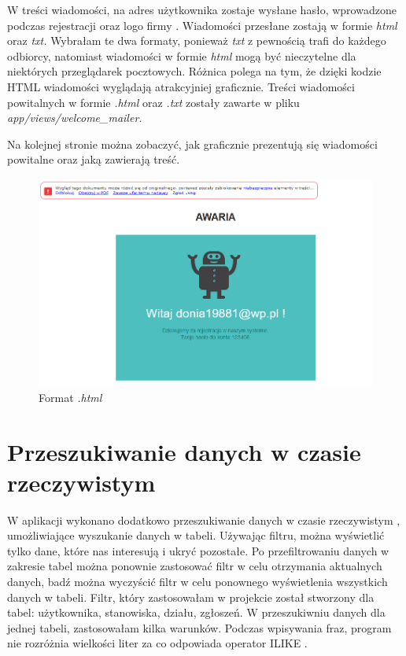 \documentclass[openright]{xmgr}
\begin{document}
	W treści wiadomości, na adres użytkownika zostaje wysłane hasło, wprowadzone podczas rejestracji oraz logo firmy \cite{api}. Wiadomości przesłane zostają w formie \textit{html} oraz \textit{txt.} Wybrałam te dwa formaty, ponieważ \textit{txt} z pewnością trafi do każdego odbiorcy, natomiast wiadomości w formie \textit{html} mogą być nieczytelne dla niektórych przeglądarek pocztowych. Różnica polega na tym, że dzięki kodzie HTML wiadomości wyglądają atrakcyjniej graficznie.
	Treści wiadomości powitalnych w formie \textit{.html} oraz \textit{.txt} zostały zawarte w pliku \textit{app/views/welcome\_mailer.}
	
	Na kolejnej stronie można zobaczyć, jak graficznie prezentują się wiadomości powitalne oraz jaką zawierają treść. 
	\newpage
	\begin{figure}[!tbh]
		\centering
		\includegraphics[width=\linewidth]{image/emailhtml}
		\caption{Format \textit{.html}}
	\end{figure}


	\newpage
	\section{Przeszukiwanie danych w czasie rzeczywistym}
	
	W aplikacji wykonano dodatkowo przeszukiwanie danych w czasie rzeczywistym \cite{filtrowanie}, umożliwiające wyszukanie danych w tabeli. Używając filtru, można wyświetlić tylko dane, które nas interesują i ukryć pozostałe. Po przefiltrowaniu danych w zakresie tabel można ponownie zastosować filtr w celu otrzymania aktualnych danych, badź można wyczyścić filtr w celu ponownego wyświetlenia wszystkich danych w tabeli. 
	Filtr, który zastosowałam w projekcie został stworzony dla tabel: użytkownika, stanowiska, działu, zgłoszeń. W przeszukiwniu danych dla jednej tabeli, zastosowałam kilka warunków. Podczas wpisywania fraz, program nie rozróżnia wielkości liter za co odpowiada operator ILIKE .\\
	
\end{document}
